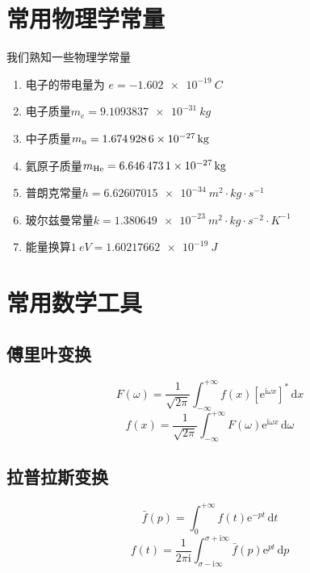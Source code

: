 \appendix\section{常用物理学常量}

我们熟知一些物理学常量
\begin{enumerate}
    \item 电子的带电量为 $e=\qty{-1.602e-19}{C}$
    \item 电子质量$m_{e}=\qty{9.1093837e-31}{kg}$
    \item 中子质量$m_{\rm n}=\qty{1.6749286 e-27}{kg}$
    \item 氦原子质量$m_{\rm He}=\qty{6.6464731E-27}{kg}$
    \item 普朗克常量$h=\qty{6.62607015e-34}{m^2\cdot kg \cdot s^{-1}}$
    \item 玻尔兹曼常量$k=\qty{1.380649e-23}{m^2\cdot kg\cdot s^{-2}\cdot K^{-1}}$
    \item 能量换算$\qty{1}{eV}=\qty{1.60217662e-19}{J}$
\end{enumerate}

\section{常用数学工具}


\subsection{傅里叶变换}
\begin{equation}\label{傅里叶变换}
    F(\omega)=\frac{1}{\sqrt{2\pi}}\int_{-\infty}^{+\infty}f(x)\left[\mathrm{e}^{\mathrm{i}\omega x}\right]^*\,\mathrm{d}x
\end{equation}
\begin{equation}\label{傅里叶逆变换}
    f(x)=\frac{1}{\sqrt{2\pi}}\int_{-\infty}^{+\infty}F(\omega)\mathrm{e}^{\mathrm{i}\omega x}\,\mathrm{d}\omega
\end{equation}


\subsection{拉普拉斯变换}
\begin{equation}\label{拉普拉斯变换}
    \bar{f}(p)=\int_{0}^{+\infty}f(t)\mathrm{e}^{-pt}\,\mathrm{d}t
\end{equation}
\begin{equation}\label{拉普拉斯逆变换}
    f(t)=\frac{1}{2\pi\mathrm{i}}\int_{\sigma-\mathrm{i}\infty}^{\sigma+\mathrm{i}\infty}\bar{f}(p)\mathrm{e}^{pt}\,\mathrm{d}p
\end{equation}
